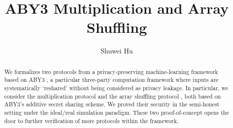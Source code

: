 \documentclass[11pt,a4paper]{article}
\begin{document}
\title{ABY3 Multiplication and Array Shuffling}
\author{Shuwei Hu}
\maketitle

\begin{abstract}
We formalizes two protocols from a privacy-preserving machine-learning framework based on ABY3 \cite{mohassel2018aby3},
a particular three-party computation framework where inputs are systematically `reshared'
without being considered as privacy leakage.
In particular, we consider the multiplication protocol \cite{mohassel2018aby3} and the array shuffling protocol \cite{laud2016secure},
both based on ABY3's additive secret sharing scheme.
We proved their security in the semi-honest setting under the ideal/real simulation paradigm.
These two proof-of-concept opens the door to further verification of more protocols within the framework.
\end{abstract}

\tableofcontents





\end{document}
